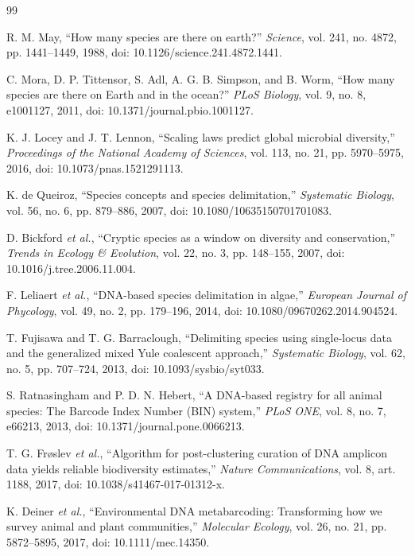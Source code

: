 \documentclass[conference]{IEEEtran}
\begin{document}
\clearpage
\balance
\begin{thebibliography}{99}

R. M. May, ``How many species are there on earth?'' \emph{Science}, vol. 241, no. 4872, pp. 1441--1449, 1988, doi: 10.1126/science.241.4872.1441.

C. Mora, D. P. Tittensor, S. Adl, A. G. B. Simpson, and B. Worm, ``How many species are there on Earth and in the ocean?'' \emph{PLoS Biology}, vol. 9, no. 8, e1001127, 2011, doi: 10.1371/journal.pbio.1001127.

K. J. Locey and J. T. Lennon, ``Scaling laws predict global microbial diversity,'' \emph{Proceedings of the National Academy of Sciences}, vol. 113, no. 21, pp. 5970--5975, 2016, doi: 10.1073/pnas.1521291113.

K. de Queiroz, ``Species concepts and species delimitation,'' \emph{Systematic Biology}, vol. 56, no. 6, pp. 879--886, 2007, doi: 10.1080/10635150701701083.

D. Bickford \emph{et al.}, ``Cryptic species as a window on diversity and conservation,'' \emph{Trends in Ecology \& Evolution}, vol. 22, no. 3, pp. 148--155, 2007, doi: 10.1016/j.tree.2006.11.004.

F. Leliaert \emph{et al.}, ``DNA-based species delimitation in algae,'' \emph{European Journal of Phycology}, vol. 49, no. 2, pp. 179--196, 2014, doi: 10.1080/09670262.2014.904524.

T. Fujisawa and T. G. Barraclough, ``Delimiting species using single-locus data and the generalized mixed Yule coalescent approach,'' \emph{Systematic Biology}, vol. 62, no. 5, pp. 707--724, 2013, doi: 10.1093/sysbio/syt033.

S. Ratnasingham and P. D. N. Hebert, ``A DNA-based registry for all animal species: The Barcode Index Number (BIN) system,'' \emph{PLoS ONE}, vol. 8, no. 7, e66213, 2013, doi: 10.1371/journal.pone.0066213.

T. G. Frøslev \emph{et al.}, ``Algorithm for post-clustering curation of DNA amplicon data yields reliable biodiversity estimates,'' \emph{Nature Communications}, vol. 8, art. 1188, 2017, doi: 10.1038/s41467-017-01312-x.

K. Deiner \emph{et al.}, ``Environmental DNA metabarcoding: Transforming how we survey animal and plant communities,'' \emph{Molecular Ecology}, vol. 26, no. 21, pp. 5872--5895, 2017, doi: 10.1111/mec.14350.


\end{thebibliography}
\end{document}
